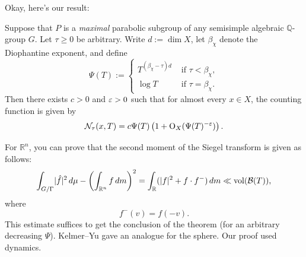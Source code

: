 \documentclass[reqno]{amsart} 
\begin{document}
Okay, here's our result:
\begin{theorem}[Pfitscher 2024]
  Suppose that $P$ is a \emph{maximal} parabolic subgroup of any semisimple algebraic $\mathbb{Q}$-group $G$.  Let $\tau \geq 0$ be arbitrary.  Write $d := \dim X$, let $\beta_\chi$ denote the Diophantine exponent, and define
  \begin{equation*}
    \Psi(T) :=
    \begin{cases}
      T^{(\beta_\chi - \tau) d} & \text{ if } \tau < \beta_\chi, \\
      \log T& \text{ if } \tau = \beta_\chi.
    \end{cases}
  \end{equation*}
  Then there exists $c > 0$ and $\varepsilon > 0$ such that for almost every $x \in X$, the counting function is given by
  \begin{equation*}
    \mathcal{N}_\tau(x, T) = c \Psi(T) \left( 1 + \operatorname{O}_X(\Psi(T)^{- \varepsilon}) \right).
  \end{equation*}
\end{theorem}

\begin{remark}
  For $\mathbb{R}^n$, you can prove that the second moment of the Siegel transform is given as follows:
  \begin{equation*}
    \int_{G / \Gamma} \lvert \hat{f} \rvert^2 \, d \mu -
    \left( \int_{\mathbb{R}^n} f \, d m \right)^2 = \int_{\mathbb{R}} (\lvert f \rvert^2 +
    f \cdot f^-) \, d m \ll \operatorname{vol}(\mathcal{B}(T)),
  \end{equation*}
  where
  \begin{equation*}
    f^-(v) = f(- v).
  \end{equation*}
  This estimate suffices to get the conclusion of the theorem (for an arbitrary decreasing $\Psi$).  Kelmer--Yu gave an analogue for the sphere.  Our proof used dynamics.
\end{remark}

{} 
\end{document}
